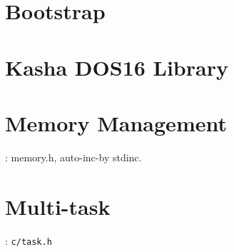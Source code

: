 

\section{Bootstrap}


\section{Kasha DOS16 Library}


\section{Memory Management}
: memory.h, auto-inc-by stdinc.

\section{Multi-task}
: \verb|c/task.h|

